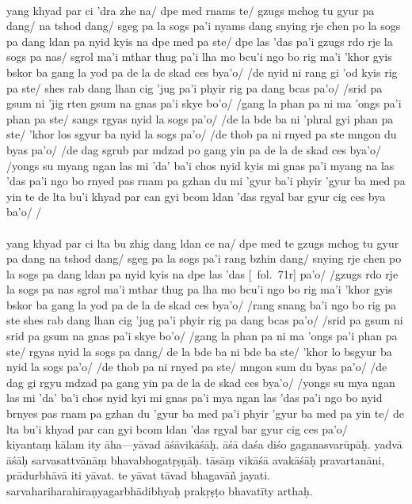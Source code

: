 \documentclass[12pt]{article}
\newcommand{\emdash} {\hspace{0em}—\hspace{0em}}
\begin{document}
\textbf{\TVA}\\
yang khyad par ci 'dra zhe na/ dpe med rnams te/ gzugs mchog tu gyur pa dang/ na tshod dang/ sgeg pa la sogs pa'i nyams dang snying rje chen po la sogs pa dang ldan pa nyid kyis na dpe med pa ste/ dpe las 'das pa'i gzugs rdo rje la sogs pa nas/ sgrol ma'i mthar thug pa'i lha mo bcu'i ngo bo rig ma'i 'khor gyis bskor ba gang la yod pa de la de skad ces bya'o/ /de nyid ni rang gi 'od kyis rig pa ste/ shes rab dang lhan cig 'jug pa'i phyir rig pa dang bcas pa'o/ /srid pa gsum ni 'jig rten gsum na gnas pa'i skye bo'o/ /gang la phan pa ni ma 'ongs pa'i phan pa ste/ sangs rgyas nyid la sogs pa'o/ /de la bde ba ni 'phral gyi phan pa ste/ 'khor los sgyur ba nyid la sogs pa'o/ /de thob pa ni rnyed pa ste mngon du byas pa'o/ /de dag sgrub par mdzad po gang yin pa de la de skad ces bya'o/ /yongs su myang ngan las mi 'da' ba'i chos nyid kyis mi gnas pa'i myang na las 'das pa'i ngo bo rnyed pas rnam pa gzhan du mi 'gyur ba'i phyir 'gyur ba med pa yin te de lta bu'i khyad par can gyi bcom ldan 'das rgyal bar gyur cig ces bya ba'o/ /\\

\textbf{\TVB}\\
yang khyad par ci lta bu zhig dang ldan ce na/ dpe med te gzugs mchog tu gyur pa dang na tshod dang/ sgeg pa la sogs pa'i rang bzhin dang/ snying rje chen po la sogs pa dang ldan pa nyid kyis na dpe las 'das [\TVB\ fol.\ 71r] pa'o/ /gzugs rdo rje la sogs pa nas sgrol ma'i mthar thug pa lha mo bcu'i ngo bo rig ma'i 'khor gyis bskor ba gang la yod pa de la de skad ces bya'o/ /rang snang ba'i ngo bo rig pa ste shes rab dang lhan cig 'jug pa'i phyir rig pa dang bcas pa'o/ /srid pa gsum ni srid pa gsum na gnas pa'i skye bo'o/ /gang la phan pa ni ma 'ongs pa'i phan pa ste/ rgyas nyid la sogs pa dang/ de la bde ba ni bde ba ste/ 'khor lo bsgyur ba nyid la sogs pa'o/ /de thob pa ni rnyed pa ste/ mngon sum du byas pa'o/ /de dag gi rgyu mdzad pa gang yin pa de la de skad ces bya'o/ /yongs su mya ngan las mi 'da' ba'i chos nyid kyi mi gnas pa'i mya ngan las 'das pa'i ngo bo nyid brnyes pas rnam pa gzhan du 'gyur ba med pa'i phyir 'gyur ba med pa yin te/ de lta bu'i khyad par can gyi bcom ldan 'das rgyal bar gyur cig ces pa'o/\\

kiyantaṃ kālam ity āha\emdash yāvad āśāvikāśāḥ.\footnoteB{
	āśāvikāsāḥ] \corr ; āśāvikāśāḥ \EDD\ \MS
} āśā daśa diśo gaganasvarūpāḥ. yadvā āśāḥ sarvasattvānāṃ bhavabhogatṛṣṇāḥ.\footnoteB{
	°tṛṣṇāḥ] \EDD\ (°tṛṣṇās); tṛṣṇā \MS
} tāsāṃ vikāśā\footnoteB{
	vikāśā] \corr; vikāsā \MS\ \EDD
} avakāśāḥ pravartanāni, prādurbhāvā iti yāvat.
te yāvat\footnoteB{
	te yāvat] \emd ; tā yāvat \MS\ \EDD ; deest \emph{in \TIB}
} tāvad bhagavāñ jayati.
sarvahariharahiraṇyagarbhādibhyaḥ prakṛṣṭo bhavatīty arthaḥ.\\
\end{document}

